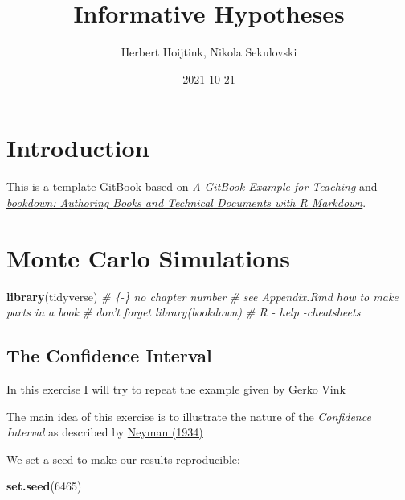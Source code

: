 \documentclass[
]{book}
\title{Informative Hypotheses}
\author{Herbert Hoijtink, Nikola Sekulovski}
\date{2021-10-21}
\newenvironment{Shaded}{\begin{snugshade}}{\end{snugshade}}
\newcommand{\CommentTok}[1]{\textcolor[rgb]{0.56,0.35,0.01}{\textit{#1}}}
\newcommand{\DecValTok}[1]{\textcolor[rgb]{0.00,0.00,0.81}{#1}}
\newcommand{\KeywordTok}[1]{\textcolor[rgb]{0.13,0.29,0.53}{\textbf{#1}}}
\newcommand{\NormalTok}[1]{#1}
\begin{document}
\maketitle

{
\setcounter{tocdepth}{1}
\tableofcontents
}
\hypertarget{introduction}{%
\chapter{Introduction}\label{introduction}}

This is a template GitBook based on \href{https://cjvanlissa.github.io/gitbook-demo/}{\emph{A GitBook Example for Teaching}} and \href{https://bookdown.org/yihui/bookdown/}{\emph{bookdown: Authoring Books and Technical Documents with R Markdown}}.

\hypertarget{monte-carlo-simulations}{%
\chapter{Monte Carlo Simulations}\label{monte-carlo-simulations}}

\begin{Shaded}
\begin{Highlighting}[]
\KeywordTok{library}\NormalTok{(tidyverse)}
\CommentTok{# \{-\} no chapter number}
\CommentTok{# see Appendix.Rmd how to make parts in a book}
\CommentTok{# don't forget library(bookdown)}
\CommentTok{# R - help -cheatsheets}
\end{Highlighting}
\end{Shaded}

\hypertarget{the-confidence-interval}{%
\section{The Confidence Interval}\label{the-confidence-interval}}

In this exercise I will try to repeat the example given by \href{https://www.gerkovink.com/markup/Wk1/Solution_to_Ex1.html}{Gerko Vink}

The main idea of this exercise is to illustrate the nature of the \emph{Confidence Interval} as described by \href{http://www.stat.cmu.edu/~brian/905-2008/papers/neyman-1934-jrss.pdf}{Neyman (1934)}

We set a seed to make our results reproducible:

\begin{Shaded}
\begin{Highlighting}[]
\KeywordTok{set.seed}\NormalTok{(}\DecValTok{6465}\NormalTok{)}
\end{Highlighting}
\end{Shaded}
\end{document}
